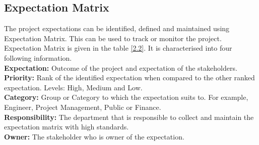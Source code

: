 \documentclass[a4paper]{article}
\begin{document}
\subsection{Expectation Matrix}
The project expectations can be identified, defined and maintained using Expectation Matrix. This can be used to track or monitor the project. Expectation Matrix is given in the table \ref{2.2}. It is characterised into four following information.\bigskip \\
\textbf{Expectation:} Outcome of the project and expectation of the stakeholders. \\
\textbf{Priority:} Rank of the identified expectation when compared to the other ranked expectation. Levels: High, Medium and Low. \\
\textbf{Category:} Group or Category to which the expectation suits to. For example, Engineer, Project Management, Public or Finance. \\
\textbf{Responsibility:} The department that is responsible to collect and maintain the expectation matrix with high standards. \\
\textbf{Owner:} The stakeholder who is owner of the expectation. 
\end{document}
